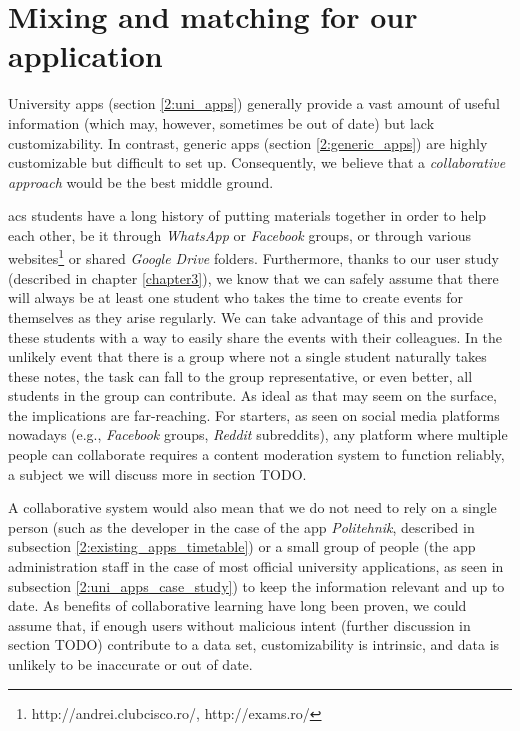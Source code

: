 \section{Mixing and matching for our application} \label{2:mix_and_match}

    University apps (section \ref{2:uni_apps}) generally provide a vast amount of useful information (which may, however, sometimes be out of date) but lack customizability. In contrast, generic apps (section \ref{2:generic_apps}) are highly customizable but difficult to set up. Consequently, we believe that a \textit{collaborative approach} would be the best middle ground.
    
    \acrshort{acs} students have a long history of putting materials together in order to help each other, be it through \textit{WhatsApp} or \textit{Facebook} groups, or through various websites\footnote{http://andrei.clubcisco.ro/, http://exams.ro/} or shared \textit{Google Drive} folders. Furthermore, thanks to our user study (described in chapter \ref{chapter3}), we know that we can safely assume that there will always be at least one student who takes the time to create events for themselves as they arise regularly. We can take advantage of this and provide these students with a way to easily share the events with their colleagues. In the unlikely event that there is a group where not a single student naturally takes these notes, the task can fall to the group representative, or even better, all students in the group can contribute. As ideal as that may seem on the surface, the implications are far-reaching. For starters, as seen on social media platforms nowadays (e.g., \textit{Facebook} groups, \textit{Reddit} subreddits), any platform where multiple people can collaborate requires a content moderation system\cite{roberts2019behind} to function reliably, a subject we will discuss more in section TODO.
    
    A collaborative system would also mean that we do not need to rely on a single person (such as the developer in the case of the app \textit{Politehnik}, described in subsection \ref{2:existing_apps_timetable}) or a small group of people (the app administration staff in the case of most official university applications, as seen in subsection \ref{2:uni_apps_case_study}) to keep the information relevant and up to date. As benefits of collaborative learning have long been proven\cite{klemm1997benefits}, we could assume that, if enough users without malicious intent (further discussion in section TODO) contribute to a data set, customizability is intrinsic, and data is unlikely to be inaccurate or out of date.
    
